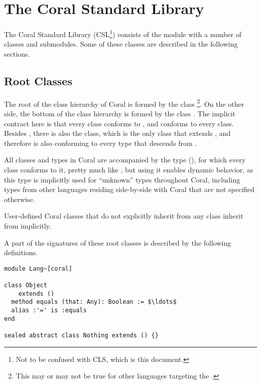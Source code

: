 
\chapter{The Coral Standard Library}

The Coral Standard Library (CSL\footnote{Not to be confused with CLS, which is this document.}) consists of the module  with a number of classes and submodules. Some of these classes are described in the following sections. 

\section{Root Classes}
\label{sec:root-classes}

The root of the class hierarchy of Coral is formed by the class \footnote{This may or may not be true for other languages targeting the .}. On the other side, the bottom of the class hierarchy is formed by the class . The implicit contract here is that every class conforms to , and  conforms to every class. Besides , there is also the  class, which is the only class that extends , and therefore is also conforming to every type that descends from . 

All classes and types in Coral are accompanied by the  type (), for which every class conforms to it, pretty much like , but using it enables dynamic behavior, as this type is implicitly used for ``unknown'' types throughout Coral, including types from other languages residing side-by-side with Coral that are not specified otherwise. 

User-defined Coral classes that do not explicitly inherit from any class inherit from  implicitly. 

A part of the signatures of these root classes is described by the following definitions. 

\begin{lstlisting}
module Lang~[coral]

class Object 
    extends ()
  method equals (that: Any): Boolean := $\ldots$
  alias :'=' is :equals
end

sealed abstract class Nothing extends () {}
\end{lstlisting}






